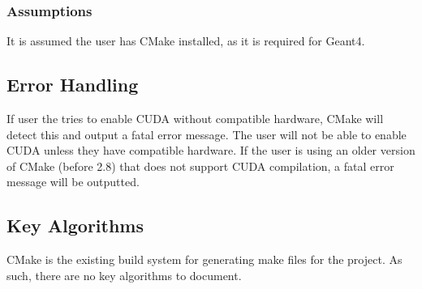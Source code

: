 \documentclass[12pt]{article}
\begin{document}
\subsubsection{Assumptions}%
It is assumed the user has CMake installed, as it is required for Geant4.

\subsection{Error Handling}
If user the tries to enable CUDA without compatible hardware, CMake will detect this and output a fatal error message. The user will not be able to enable CUDA unless they have compatible hardware. If the user is using an older version of CMake (before 2.8) that does not support CUDA compilation, a fatal error message will be outputted.

\subsection{Key Algorithms}
CMake is the existing build system for generating make files for the project. As such, there are no key algorithms to document.

\end{document}
